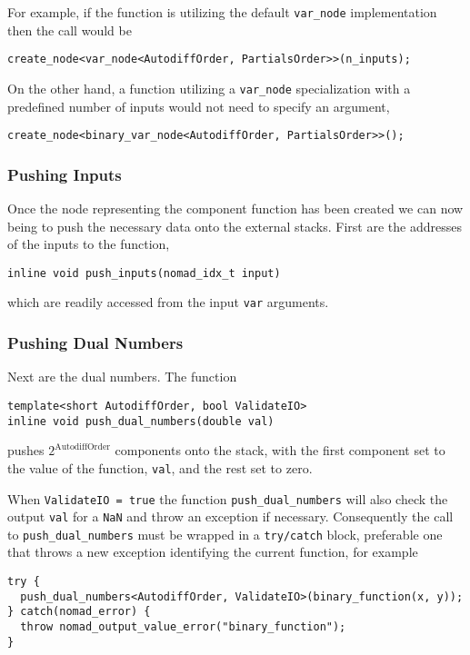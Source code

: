 For example, if the function is utilizing the default \verb|var_node|
implementation then the call would be
%
\begin{verbatim}
create_node<var_node<AutodiffOrder, PartialsOrder>>(n_inputs);
\end{verbatim}
%
On the other hand, a function utilizing a \verb|var_node| specialization
with a predefined number of inputs would not need to specify an
argument,
%
\begin{verbatim}
create_node<binary_var_node<AutodiffOrder, PartialsOrder>>();
\end{verbatim}

\subsubsection{Pushing Inputs}

Once the node representing the component function has been created
we can now being to push the necessary data onto the external stacks.
First are the addresses of the inputs to the function,
%
\begin{verbatim}
inline void push_inputs(nomad_idx_t input)
\end{verbatim}
%
which are readily accessed from the input \verb|var| arguments.

\subsubsection{Pushing Dual Numbers}

Next are the dual numbers.  The function
%
\begin{verbatim}
template<short AutodiffOrder, bool ValidateIO>
inline void push_dual_numbers(double val)
\end{verbatim}
%
pushes $2^{\mathrm{AutodiffOrder}}$ components onto the stack, with
the first component set to the value of the function, \verb|val|, and the
rest set to zero.

When \verb|ValidateIO = true| the function \verb|push_dual_numbers|
will also check the output \verb|val| for a \verb|NaN| and throw an
exception if necessary.  Consequently the call to \verb|push_dual_numbers|
must be wrapped in a \verb|try/catch| block, preferable one that throws
a new exception identifying the current function, for example
%
\begin{verbatim}
try {
  push_dual_numbers<AutodiffOrder, ValidateIO>(binary_function(x, y));
} catch(nomad_error) {
  throw nomad_output_value_error("binary_function");
}
\end{verbatim}

